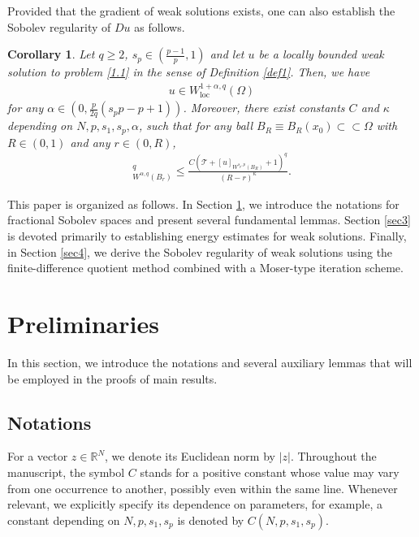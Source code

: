 \documentclass[reqno,10pt]{amsart}
\numberwithin{equation}{section}
\newtheorem{corollary}[theorem]{Corollary}
\begin{document}
Provided that the gradient of weak solutions exists, one can also establish the Sobolev regularity of $Du$ as follows.

\begin{corollary}
	\label{corG}
	Let $q\ge2$, $s_p\in\left( \frac{p-1}{p},1\right) $ and let $u$ be a locally bounded weak solution to problem \eqref{1.1} in the sense of Definition \ref{def1}. Then, we have
	\begin{align*}
		u\in W^{1+\alpha,q}_\mathrm{loc}(\Omega)
	\end{align*}
	for any $\alpha\in \left( 0,\frac{p}{2q}(s_pp-p+1)\right) $. Moreover, there exist constants $C$ and $\kappa$ depending on $N, p, s_1, s_p,\alpha$, such that for any ball $B_R\equiv B_R(x_0)\subset\subset\Omega$ with $R\in (0,1)$ and any $r\in(0,R)$,
	\begin{align*}
		[\nabla u]^{q}_{W^{\alpha,q}(B_r)}\le \frac{C\left( \mathcal{T}+[u]_{W^{s_p,p}(B_R)}+1\right)^q}{(R-r)^{\kappa}}.
	\end{align*}
\end{corollary} 

This paper is organized as follows. In Section \ref{sec2}, we introduce the notations for fractional Sobolev spaces and present several fundamental lemmas. Section \ref{sec3} is devoted primarily to establishing energy estimates for weak solutions. Finally, in Section \ref{sec4}, we derive the Sobolev regularity of weak solutions using the finite-difference quotient method combined with a Moser-type iteration scheme.


\section{Preliminaries}
\label{sec2}
In this section, we introduce the notations and several auxiliary lemmas that will be employed in the proofs of main results.

\subsection{Notations}

For a vector $z\in\mathbb{R}^N$, we denote its Euclidean norm by $|z|$. Throughout the manuscript, the symbol $C$ stands for a positive constant whose value may vary from one occurrence to another, possibly even within the same line. Whenever relevant, we explicitly specify its dependence on parameters, for example, a constant depending on $N,p,s_1,s_p$ is denoted by $C(N,p,s_1,s_p)$.
\end{document}
